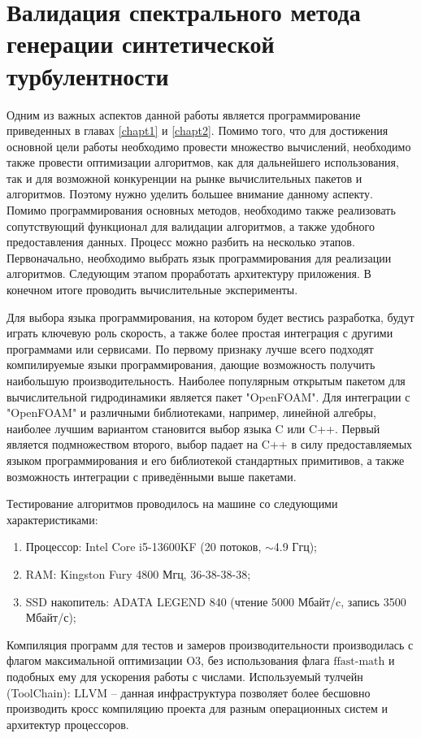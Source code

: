 \chapter{Валидация спектрального метода генерации синтетической турбулентности} \label{chapt4}

Одним из важных аспектов данной работы является программирование приведенных в главах \ref{chapt1} и \ref{chapt2}. Помимо того, что для достижения основной цели работы необходимо провести множество вычислений, необходимо также провести оптимизации алгоритмов, как для дальнейшего использования, так и для возможной конкуренции на рынке вычислительных пакетов и алгоритмов. Поэтому нужно уделить большее внимание данному аспекту. Помимо программирования основных методов, необходимо также реализовать сопутствующий функционал для валидации алгоритмов, а также удобного предоставления данных. Процесс можно разбить на несколько этапов. Первоначально, необходимо выбрать язык программирования для реализации алгоритмов. Следующим этапом проработать архитектуру приложения. В конечном итоге проводить вычислительные эксперименты.

Для выбора языка программирования, на котором будет вестись разработка, будут играть ключевую роль скорость, а также более простая интеграция с другими программами или сервисами. По первому признаку лучше всего подходят компилируемые языки программирования, дающие возможность получить наибольшую производительность. Наиболее популярным открытым пакетом для вычислительной гидродинамики является пакет "OpenFOAM". Для интеграции с "OpenFOAM" и различными библиотеками, например, линейной алгебры, наиболее лучшим вариантом становится выбор языка C или C++. Первый является подмножеством второго, выбор падает на C++ в силу предоставляемых языком программирования и его библиотекой стандартных примитивов, а также возможность интеграции с приведёнными выше пакетами. 

Тестирование алгоритмов проводилось на машине со следующими характеристиками:

\begin{enumerate}
	\item Процессор: Intel Core i5-13600KF (20 потоков, $\sim$4.9 Ггц);
	\item RAM: Kingston Fury 4800 Мгц, 36-38-38-38;
	\item SSD накопитель: ADATA LEGEND 840 (чтение 5000 Мбайт/c, запись 3500 Мбайт/с);
\end{enumerate}

Компиляция программ для тестов и замеров производительности производилась с флагом максимальной оптимизации $\text{O3}$, без использования флага $\text{ffast-math}$ и подобных ему для ускорения работы с числами. Используемый тулчейн (ToolChain): $\text{LLVM}$ -- данная инфраструктура позволяет более бесшовно производить кросс компиляцию проекта для разным операционных систем и архитектур процессоров.

